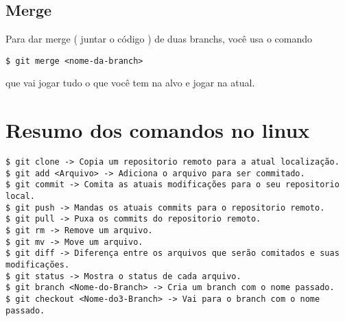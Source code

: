 \documentclass{article}
\begin{document}
\subsection{Merge}
    Para dar merge ( juntar o código ) de duas branchs, você usa o comando
\begin{tabbing}
    \hspace{1cm}\=\verb#$ git merge <nome-da-branch>#\\
\end{tabbing}
que vai jogar tudo o que você tem na alvo e jogar na atual.
\section{Resumo dos comandos no linux}
\begin{tabbing}
\hspace{0.5cm}  \=  \verb#$ git clone -> Copia um repositorio remoto para a atual localização.#\\
                \>  \verb#$ git add <Arquivo> -> Adiciona o arquivo para ser commitado.#\\
                \>  \verb#$ git commit -> Comita as atuais modificações para o seu repositorio local.#\\
                \>  \verb#$ git push -> Mandas os atuais commits para o repositorio remoto.#\\
                \>  \verb#$ git pull -> Puxa os commits do repositorio remoto.#\\
                \>  \verb#$ git rm -> Remove um arquivo.#\\
                \>  \verb#$ git mv -> Move um arquivo.#\\
                \>  \verb#$ git diff -> Diferença entre os arquivos que serão comitados e suas modificações.#\\
                \>  \verb#$ git status -> Mostra o status de cada arquivo.#\\
                \>  \verb#$ git branch <Nome-do-Branch> -> Cria um branch com o nome passado.#\\
                \>  \verb#$ git checkout <Nome-do3-Branch> -> Vai para o branch com o nome passado.#\\
\end{tabbing}
\end{document}
